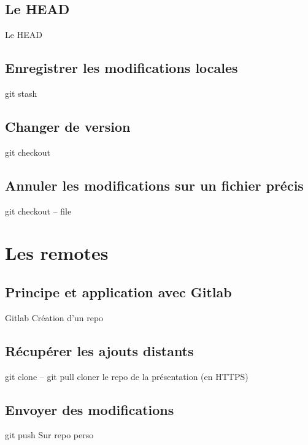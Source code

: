 \documentclass[usepdftitle=false]{beamer}
\begin{document}
\subsection{Le HEAD}

\begin{frame}{Le HEAD}
\end{frame}

\subsection{Enregistrer les modifications locales}

\begin{frame}{git stash}
\end{frame}

\subsection{Changer de version}

\begin{frame}{git checkout}
\end{frame}

\subsection{Annuler les modifications sur un fichier précis}

\begin{frame}{git checkout -- file}
\end{frame}

\section{Les remotes}

\subsection{Principe et application avec Gitlab}

\begin{frame}{Gitlab}
	Création d'un repo
\end{frame}

\subsection{Récupérer les ajouts distants}

\begin{frame}{git clone -- git pull}
	cloner le repo de la présentation (en HTTPS)
\end{frame}

\subsection{Envoyer des modifications}

\begin{frame}{git push}
	Sur repo perso
\end{frame}
\end{document}
